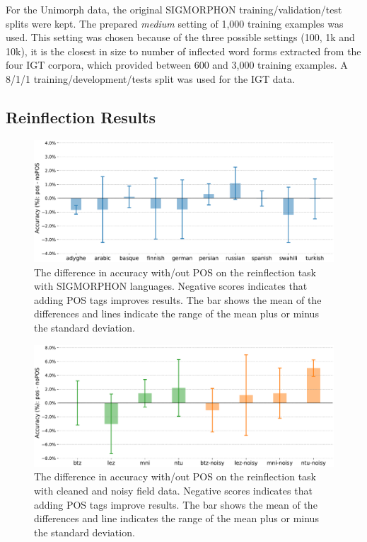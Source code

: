 For the Unimorph data, the original SIGMORPHON training/validation/test splits were kept. The prepared \textit{medium} setting of 1,000 training examples was used. This setting was chosen because of the three possible settings (100, 1k and 10k), it is the closest in size to number of inflected word forms extracted from the four IGT corpora, which provided between 600 and 3,000 training examples. A 8/1/1 training/development/tests split was used for the IGT data.


\subsection{Reinflection Results}
\label{sec:inflectionresults}

\begin{figure}[ht]
    \centering
    \includegraphics[width=34em]{figs/pos_2018data.pdf}
    \caption{The difference in accuracy with/out POS on the reinflection task with SIGMORPHON languages. Negative scores indicates that adding POS tags improves results. The bar shows the mean of the differences and lines indicate the range of the mean plus or minus the standard deviation.}
    \label{fig:sigreinfl}
\end{figure}

\begin{figure}[ht]
    \centering
    \includegraphics[width=41em]{figs/pos_igtdata.pdf}
    \caption{The difference in accuracy with/out POS on the reinflection task with cleaned and noisy field data. Negative scores indicates that adding POS tags improve results. The bar shows the mean of the differences and line indicates the range of the mean plus or minus the standard deviation.}
    \label{fig:igtreinfl}
\end{figure}


